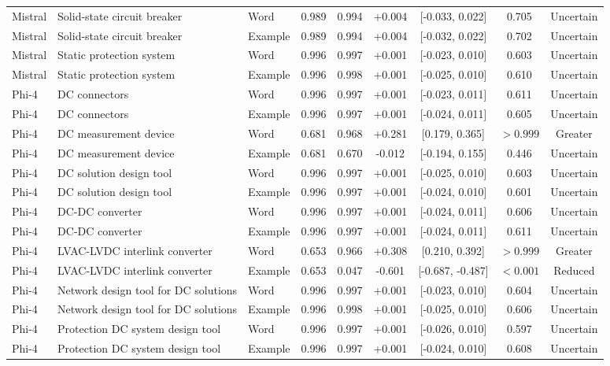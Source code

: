\begin{landscape}
\begin{longtable}{lllcccccc}
Mistral & Solid-state circuit breaker & Word & 0.989 & 0.994 & +0.004 & [-0.033, 0.022] & 0.705 & Uncertain \\
Mistral & Solid-state circuit breaker & Example & 0.989 & 0.994 & +0.004 & [-0.032, 0.022] & 0.702 & Uncertain \\
Mistral & Static protection system & Word & 0.996 & 0.997 & +0.001 & [-0.023, 0.010] & 0.603 & Uncertain \\
Mistral & Static protection system & Example & 0.996 & 0.998 & +0.001 & [-0.025, 0.010] & 0.610 & Uncertain \\
Phi-4 & DC connectors & Word & 0.996 & 0.997 & +0.001 & [-0.023, 0.011] & 0.611 & Uncertain \\
Phi-4 & DC connectors & Example & 0.996 & 0.997 & +0.001 & [-0.024, 0.011] & 0.605 & Uncertain \\
Phi-4 & DC measurement device & Word & 0.681 & 0.968 & +0.281 & [0.179, 0.365] & $>0.999$ & Greater \\
Phi-4 & DC measurement device & Example & 0.681 & 0.670 & -0.012 & [-0.194, 0.155] & 0.446 & Uncertain \\
Phi-4 & DC solution design tool & Word & 0.996 & 0.997 & +0.001 & [-0.025, 0.010] & 0.603 & Uncertain \\
Phi-4 & DC solution design tool & Example & 0.996 & 0.997 & +0.001 & [-0.024, 0.010] & 0.601 & Uncertain \\
Phi-4 & DC-DC converter & Word & 0.996 & 0.997 & +0.001 & [-0.024, 0.011] & 0.606 & Uncertain \\
Phi-4 & DC-DC converter & Example & 0.996 & 0.997 & +0.001 & [-0.024, 0.011] & 0.611 & Uncertain \\
Phi-4 & LVAC-LVDC interlink converter & Word & 0.653 & 0.966 & +0.308 & [0.210, 0.392] & $>0.999$ & Greater \\
Phi-4 & LVAC-LVDC interlink converter & Example & 0.653 & 0.047 & -0.601 & [-0.687, -0.487] & $<0.001$ & Reduced \\
Phi-4 & Network design tool for DC solutions & Word & 0.996 & 0.997 & +0.001 & [-0.023, 0.010] & 0.604 & Uncertain \\
Phi-4 & Network design tool for DC solutions & Example & 0.996 & 0.998 & +0.001 & [-0.025, 0.010] & 0.606 & Uncertain \\
Phi-4 & Protection DC system design tool & Word & 0.996 & 0.997 & +0.001 & [-0.026, 0.010] & 0.597 & Uncertain \\
Phi-4 & Protection DC system design tool & Example & 0.996 & 0.997 & +0.001 & [-0.024, 0.010] & 0.608 & Uncertain \\

\end{longtable}
\end{landscape}
